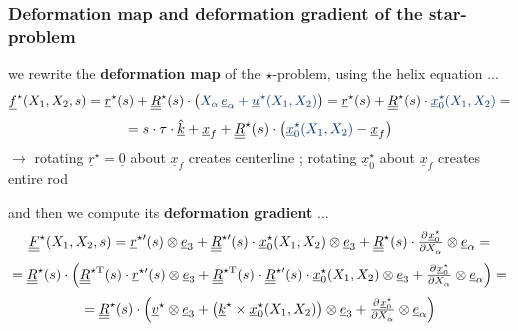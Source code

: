 \begin{frame}
  \frametitle{Deformation map and deformation gradient of the star-problem}

  we rewrite the \textbf{deformation map} of the $\star$-problem, using the helix equation ... 
  \begin{displaymath}
    \underline{f}^{\star}(X_1,X_2,s) =
    \underline{r}^{\star}(s) + 
    \doubleunderline{R}^{\star}(s) \cdot \bigl( {\color{faublue} X_{\alpha} \, \underline{e}_{\alpha} + \underline{u}^{\star}(X_1,X_2)} \bigr) = 
    \underline{r}^{\star}(s) + 
    \doubleunderline{R}^{\star}(s) \cdot {\color{faublue} \underline{x}^{\star}_0(X_1,X_2)} =
  \end{displaymath}
  \begin{displaymath}
    = s \cdot \tau \cdot \underline{\hat{k}} + \underline{x}_f + \doubleunderline{R}^{\star}(s) \cdot \bigl( {\color{faublue} \underline{x}^{\star}_0(X_1,X_2)} - \underline{x}_f \bigr)
  \end{displaymath}
  $\rightarrow$ rotating $\underline{r}^{\star} = \underline{0}$ about $\underline{x}_f$ creates centerline ; rotating $\underline{x}^{\star}_0$ about $\underline{x}_f$ creates entire rod
  
  \vspace{1.5em}
  and then we compute its \textbf{deformation gradient} ...
  \begin{displaymath}
    \doubleunderline{F}^{\star}(X_1,X_2,s) =
    \underline{r}^{\star \prime}(s) \otimes \underline{e}_3 +
    \doubleunderline{R}^{\star \prime}(s) \cdot \underline{x}_0^{\star}(X_1,X_2) \otimes \underline{e}_3 +
    \doubleunderline{R}^{\star}(s) \cdot \pd{\underline{x}_0^{\star}}{X_{\alpha}} \otimes \underline{e}_{\alpha} =
  \end{displaymath}
  \begin{displaymath}
  = \doubleunderline{R}^{\star}(s) \cdot \Bigl(
      \doubleunderline{R}^{\star \mathrm{T}}(s) \cdot \underline{r}^{\star \prime}(s) \otimes \underline{e}_3 +
      \doubleunderline{R}^{\star \mathrm{T}}(s) \cdot \doubleunderline{R}^{\star \prime}(s) \cdot \underline{x}_0^{\star}(X_1,X_2) \otimes \underline{e}_3 +
      \pd{\underline{x}_0^{\star}}{X_{\alpha}} \otimes \underline{e}_{\alpha}
    \Bigr) =
  \end{displaymath}
  \begin{displaymath}
    = \doubleunderline{R}^{\star}(s) \cdot \Bigl(
      \underline{v}^{\star} \otimes \underline{e}_3 +
      \bigl( \underline{k}^{\star} \times \underline{x}_0^{\star}(X_1,X_2) \bigr) \otimes \underline{e}_3 +
      \pd{\underline{x}_0^{\star}}{X_{\alpha}} \otimes \underline{e}_{\alpha}
    \Bigr)
  \end{displaymath}

\end{frame}


